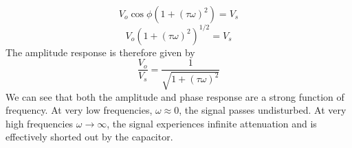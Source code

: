     \begin{equation}
        V_o \cos \phi (1  + (\tau \omega)^2 ) = V_s
    \end{equation}
    \begin{equation}
        V_o (1  + (\tau \omega)^2 )^{1/2} = V_s
    \end{equation}
 The amplitude response is therefore given by
    \begin{equation}
        \frac{V_o}{V_s} = \frac{1}{\sqrt{1 + (\tau \omega)^2}}
    \end{equation}
We can see that both the amplitude and phase response are a strong function of frequency.  At very low frequencies, $\omega \approx 0$, the signal passes undisturbed.  At very high frequencies $\omega \rightarrow \infty$, the signal experiences infinite attenuation and is effectively shorted out by the capacitor.

